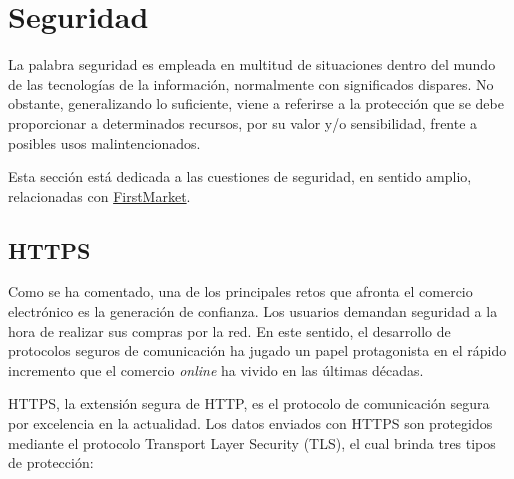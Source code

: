 \documentclass[a4paper]{article}
\begin{document}
	\section{Seguridad} \label{sec:security}
	La palabra seguridad es empleada en multitud de situaciones dentro del mundo de las tecnologías de la información, normalmente con significados dispares. No obstante, generalizando lo suficiente, viene a referirse a la protección que se debe proporcionar a determinados recursos, por su valor y/o sensibilidad, frente a posibles usos malintencionados.
	
	Esta sección está dedicada a las cuestiones de seguridad, en sentido amplio, relacionadas con \href{https://firstmarket.tech}{FirstMarket}.
	\subsection{HTTPS} \label{sec:https}
	Como se ha comentado, una de los principales retos que afronta el comercio electrónico es la generación de confianza. Los usuarios demandan seguridad a la hora de realizar sus compras por la red. En este sentido, el desarrollo de protocolos seguros de comunicación ha jugado un papel protagonista en el rápido incremento que el comercio \emph{online} ha vivido en las últimas décadas.
	
	HTTPS, la extensión segura de HTTP, es el protocolo de comunicación segura por excelencia en la actualidad. Los datos enviados con HTTPS son protegidos mediante el protocolo Transport Layer Security (TLS), el cual brinda tres tipos de protección:
	
\end{document}
